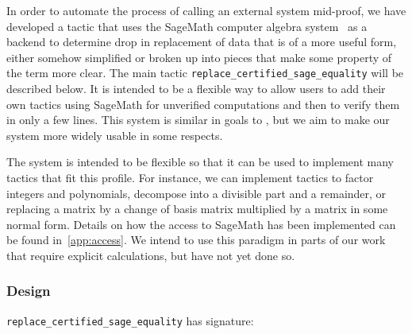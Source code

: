 \documentclass[sigplan,10pt,nonacm,
screen]{acmart} \settopmatter{printfolios=true,printccs=false,printacmref=false}
\begin{document}
In order to automate the process of calling an external system mid-proof, we have developed a tactic that uses the SageMath computer algebra system~\cite{sagemath} as a backend to determine drop in replacement of data that is of a more useful form, either somehow simplified or broken up into pieces that make some property of the term more clear.
The main tactic \lstinline{replace_certified_sage_equality} will be described below.
It is intended to be a flexible way to allow users to add their own tactics using SageMath for unverified computations and then to verify them in only a few lines.
This system is similar in goals to \cite{lewis_extensible_2017, lewis_bi-directional_2022}, but we aim to make our system more widely usable in some respects.

The system is intended to be flexible so that it can be used to implement many tactics that fit this profile.
For instance, we can implement tactics to factor integers and polynomials, decompose into a divisible part and a remainder, or replacing a matrix by a change of basis matrix multiplied by a matrix in some normal form.
Details on how the access to SageMath has been implemented can be found in~\cref{app:access}.
We intend to use this paradigm in parts of our work that require explicit calculations, but have not yet done so.

\subsubsection*{Design}
\lstinline{replace_certified_sage_equality} has signature:
\end{document}
